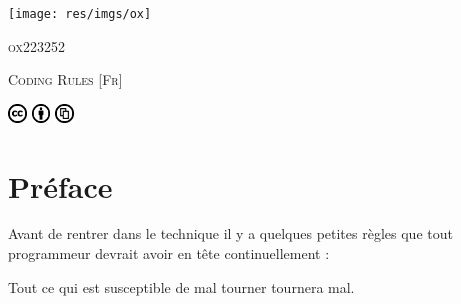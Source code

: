 \documentclass{report}
\newenvironment{extrait}[1]{\small\slshape
\savebox{\auteurbm}{\upshape\sffamily#1}
\begin{flushright}}{\\[4pt]\usebox{\auteurbm}
\end{flushright}\normalsize\upshape}
\begin{document}
	\begin{titlepage}
		\begin{minipage}{0.4\textwidth}
			\begin{flushleft}
				\texttt{[image: res/imgs/ox]}
			\end{flushleft}
		\end{minipage}
		\begin{minipage}{0.4\textwidth}
			\begin{flushright}
				\begin{flushright}
					\textsc{ox223252}
				\end{flushright}
			\end{flushright}
		\end{minipage}
		\vfill
			\center\huge\textsc{Coding Rules}
			\center\textsc{[Fr]}
		\vfill
		\begin{minipage}{0.4\textwidth}
			\begin{flushleft} \large
				\includegraphics[height=0.5cm]{res/imgs/cc}
				\includegraphics[height=0.5cm]{res/imgs/by}
				\includegraphics[height=0.5cm]{res/imgs/share}
			\end{flushleft}
		\end{minipage}
		\begin{minipage}{0.4\textwidth}
			\begin{flushright}
			\end{flushright}
		\end{minipage}
	\end{titlepage}

	\tableofcontents
	\listoffigures

	\newpage
	\setcounter{page}{1}

	

	\chapter{Préface}
		Avant de rentrer dans le technique il y a quelques petites règles que tout programmeur devrait avoir en tête continuellement :

		\begin{extrait}{Murphy}
			Tout ce qui est susceptible de mal tourner tournera mal.
		\end{extrait}
\end{document}
